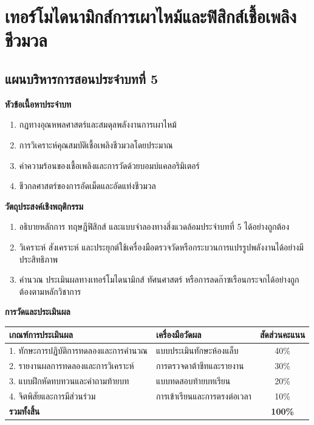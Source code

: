 \chapter{เทอร์โมไดนามิกส์การเผาไหม้และฟิสิกส์เชื้อเพลิงชีวมวล}
\label{chap:ch05}

\section*{แผนบริหารการสอนประจำบทที่ 5}

\noindent\textbf{หัวข้อเนื้อหาประจำบท}
\begin{enumerate}
    \item กฎทางอุณหพลศาสตร์และสมดุลพลังงานการเผาไหม้
    \item การวิเคราะห์คุณสมบัติเชื้อเพลิงชีวมวลโดยประมาณ
    \item ค่าความร้อนของเชื้อเพลิงและการวัดด้วยบอมบ์แคลอริมิเตอร์
    \item ชีวกลศาสตร์ของการอัดเม็ดและอัดแท่งชีวมวล
\end{enumerate}

\noindent\textbf{วัตถุประสงค์เชิงพฤติกรรม}
\begin{enumerate}
    \item อธิบายหลักการ ทฤษฎีฟิสิกส์ และแบบจำลองทางสิ่งแวดล้อมประจำบทที่ 5 ได้อย่างถูกต้อง
    \item วิเคราะห์ สังเคราะห์ และประยุกต์ใช้เครื่องมือตรวจวัดหรือกระบวนการแปรรูปพลังงานได้อย่างมีประสิทธิภาพ
    \item คำนวณ ประเมินผลทางเทอร์โมไดนามิกส์ ทัศนศาสตร์ หรือการลดก๊าซเรือนกระจกได้อย่างถูกต้องตามหลักวิชาการ
\end{enumerate}

\noindent\textbf{การวัดและประเมินผล}
\begin{table}[H]
\centering\small
\begin{tabularx}{\textwidth}{p{} p{} c}
\toprule
\textbf{เกณฑ์การประเมินผล} & \textbf{เครื่องมือวัดผล} & \textbf{สัดส่วนคะแนน} \\
\midrule
1. ทักษะการปฏิบัติการทดลองและการคำนวณ & แบบประเมินทักษะห้องแล็บ & 40\% \\
2. รายงานผลการทดลองและการวิเคราะห์ & การตรวจดาต้าชีทและรายงาน & 30\% \\
3. แบบฝึกหัดทบทวนและคำถามท้ายบท & แบบทดสอบท้ายบทเรียน & 20\% \\
4. จิตพิสัยและการมีส่วนร่วม & การเข้าเรียนและการตรงต่อเวลา & 10\% \\
\midrule
\textbf{รวมทั้งสิ้น} & & \textbf{100\%} \\
\bottomrule
\end{tabularx}
\end{table}
\newpage

